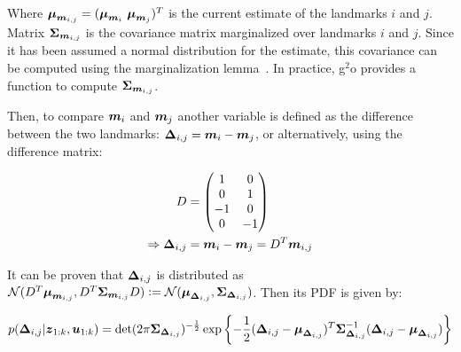 Where $\boldsymbol{\mu}_{\boldsymbol{m}_{i,j}}=(\boldsymbol{\mu}_{\boldsymbol{m}_i}~ \boldsymbol{\mu}_{\boldsymbol{m}_j})^T$ is the current estimate of the landmarks $i$ and $j$. Matrix $\boldsymbol{\Sigma}_{\boldsymbol{m}_{i,j}}$ is the covariance matrix marginalized over landmarks $i$ and $j$. Since it has been assumed a normal distribution for the estimate, this covariance can be computed using the marginalization lemma~\cite{graphslam}. In practice, g$^2$o provides a function to compute $\boldsymbol{\Sigma}_{\boldsymbol{m}_{i,j}}$.

Then, to compare $\boldsymbol{m}_i$ and $\boldsymbol{m}_j$ another variable is defined as the difference between the two landmarks: $\boldsymbol{\Delta}_{i,j}=\boldsymbol{m}_i-\boldsymbol{m}_j$, or alternatively, using the difference matrix:

\begin{align}
D &= \begin{pmatrix}
1 & 0\\
0 & 1\\
-1 & 0\\
0 & -1
\end{pmatrix}\\
\Rightarrow 
\boldsymbol{\Delta}_{i,j}&=\boldsymbol{m}_i-\boldsymbol{m}_j = D^T\boldsymbol{m}_{i,j}
\end{align}

It can be proven that $\boldsymbol{\Delta}_{i,j}$ is distributed as $\mathcal{N}(D^T\boldsymbol{\mu}_{\boldsymbol{m}_{i,j}}, D^T \boldsymbol{\Sigma}_{\boldsymbol{m}_{i,j}} D)\vcentcolon= \mathcal{N}(\boldsymbol{\mu}_{\boldsymbol{\Delta}_{i,j}}, \boldsymbol{\Sigma}_{\boldsymbol{\Delta}_{i,j}})$. Then its PDF is given by:


\begin{equation}
p(\boldsymbol{\Delta}_{i,j}|\boldsymbol{z}_{1:k},\boldsymbol{u}_{1:k})=
\det(2\pi \boldsymbol{\Sigma}_{\boldsymbol{\Delta}_{i,j}})^{-\frac{1}{2}}\exp\left\lbrace -\frac{1}{2}(\boldsymbol{\Delta}_{i,j}-\boldsymbol{\mu}_{\boldsymbol{\Delta}_{i,j}})^T
\boldsymbol{\Sigma}_{\boldsymbol{\Delta}_{i,j}}^{-1}(\boldsymbol{\Delta}_{i,j}-\boldsymbol{\mu}_{\boldsymbol{\Delta}_{i,j}})\right\rbrace
\label{eq:correspondence-test}
\end{equation}


